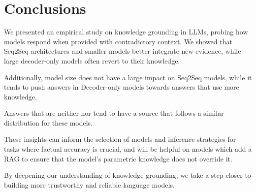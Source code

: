 \section{Conclusions}

We presented an empirical study on knowledge grounding in LLMs, probing how models respond when provided with contradictory context.
We showed that Seq2Seq architectures and smaller models better integrate new evidence, while large decoder-only models often revert to their \Parametric{} knowledge.

Additionally, model size does not have a large impact on Seq2Seq models, while it tends to push answers in Decoder-only models towards answers that use more \Paramteric{} knowledge.

Answers that are neither \Parametric{} nor \Contextual{} tend to have a source that follows a similar distribution for these models.

These insights can inform the selection of models and inference strategies for tasks where factual accuracy is crucial, and will be helpful on models which add a RAG to ensure that the model's parametric knowledge does not override it.

By deepening our understanding of knowledge grounding, we take a step closer to building more trustworthy and reliable language models.
